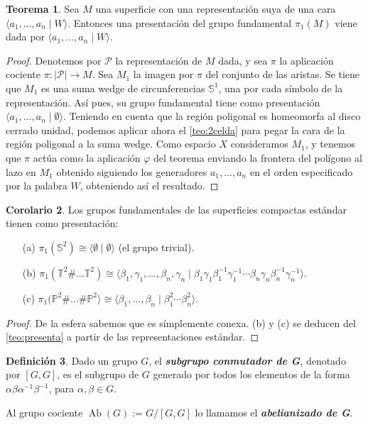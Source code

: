 \documentclass[10pt]{report}
\DeclareMathOperator{\Ab}{Ab}
\newcommand{\Esfera}{\mathbb{S}^2}
\newcommand{\Toro}{\mathbb{T}^2}
\newcommand{\Proyectivo}{\mathbb{P}^2}
\newcommand{\enfatiza}[1]{\textbf{\textit{#1}}}
\theoremstyle{definition}
\newtheorem{defin}{Definición}[section]
\newtheorem{tma}[defin]{Teorema}
\newtheorem{corol}[defin]{Corolario}
\begin{document}
\begin{tma}\label{teo:presenta}
Sea $M$ una superficie con una representación suya de una cara $\langle a_1, \dots , a_n \mid W\rangle$. Entonces una presentación del grupo fundamental $\pi_1 (M)$ viene dada por $\langle a_1, \dots , a_n \mid W\rangle$.
\end{tma}
\begin{proof}
Denotemos por $\mathcal{P}$ la representación de $M$ dada, y sea $\pi$ la aplicación cociente $\pi: |\mathcal{P}| \to M$. Sea $M_1$ la imagen por $\pi$ del conjunto de las aristas. Se tiene que $M_1$ es una suma wedge de circunferencias $\mathbb{S}^1$, una por cada símbolo de la representación. Así pues, su grupo fundamental tiene como presentación $\langle a_1, \dots ,a_n \mid \emptyset \rangle$. 
Teniendo en cuenta que la región poligonal es homeomorfa al disco cerrado unidad, podemos aplicar ahora el \autoref{teo:2celda} para pegar la cara de la región poligonal a la suma wedge. Como espacio $X$ consideramos $M_1$, y tenemos que $\pi$ actúa como la aplicación $\varphi$ del teorema enviando la frontera del polígono al lazo en $M_1$ obtenido siguiendo los generadores $a_1, \dots , a_n$ en el orden especificado por  la palabra $W$, obteniendo así el resultado.
\end{proof}


\begin{corol}
Los grupos fundamentales de las superficies compactas estándar tienen como presentación:
\begin{itemize}
\item[(a)] $\pi_1 (\Esfera ) \cong \langle \emptyset \mid \emptyset \rangle $ (el grupo trivial).
\item[(b)] $\pi_1 ( \Toro \# \dots \Toro) \cong \langle \beta_1 , \gamma_1 ,\dots ,\beta_n , \gamma_n \mid \beta_1 \gamma_1 \beta^{-1}_1 \gamma^{-1}_1\cdots \beta_n \gamma_n \beta^{-1}_n \gamma^{-1}_n \rangle$.
\item[(c)] $\pi_1(\Proyectivo \# \dots \# \Proyectivo \rangle \cong \langle \beta_1 , \dots , \beta_n \mid \beta_1^{2} \cdots \beta_n^{2} \rangle $. 
\end{itemize}
\end{corol}
\begin{proof}
De la esfera sabemos que es símplemente conexa. (b) y (c) se deducen del \autoref{teo:presenta} a partir de las representaciones estándar.
\end{proof}

\begin{defin}
Dado un grupo $G$, el \enfatiza{subgrupo conmutador de G}, denotado por $\left[ G, G \right]$, es el subgrupo de $G$ generado por todos los elementos de la forma $\alpha \beta \alpha^{-1} \beta^{-1}$, para $\alpha , \beta \in G$. 

Al grupo cociente $\Ab{(G)} := G / \left[ G,G \right]$ lo llamamos el \enfatiza{abelianizado de G}. 
\end{defin}
\end{document}
